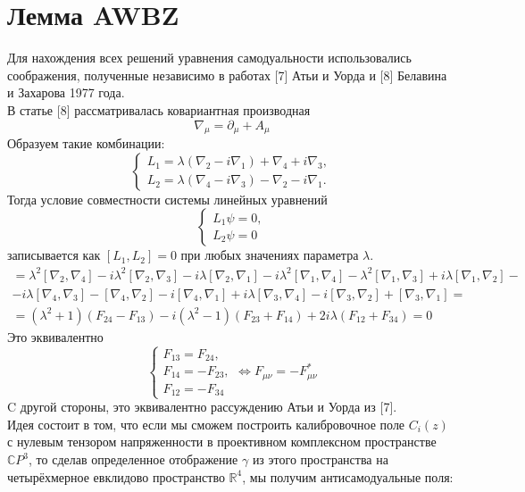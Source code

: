 \documentclass[12pt]{article}
\theoremstyle{definition}
\begin{document}
\section{Лемма AWBZ}
Для нахождения всех решений уравнения самодуальности использовались соображения, полученные независимо в работах [7] Атьи и Уорда и [8] Белавина и Захарова 1977 года.\\
В статье [8] рассматривалась ковариантная производная
\begin{equation}
    \nabla_\mu=\partial_\mu+A_\mu
\end{equation}
Образуем такие комбинации:
\begin{equation}
\begin{cases}
    L_1=\lambda(\nabla_2-i\nabla_1)+\nabla_4+i\nabla_3,\\
    L_2=\lambda(\nabla_4-i\nabla_3)-\nabla_2-i\nabla_1.
\end{cases}
\end{equation}
Тогда условие совместности системы линейных уравнений
\begin{equation}
    \begin{cases}
        L_1\psi=0,\\
        L_2\psi=0
    \end{cases}
\end{equation}
записывается как $[L_1,L_2]=0$ при любых значениях параметра $\lambda$.
\begin{multline}
    [L_1,L_2]=\lambda^2[\nabla_2,\nabla_4]-i\lambda^2[\nabla_2,\nabla_3]-i\lambda[\nabla_2,\nabla_1]-i\lambda^2[\nabla_1,\nabla_4]-\lambda^2[\nabla_1,\nabla_3]+i\lambda[\nabla_1,\nabla_2]-\\-i\lambda[\nabla_4,\nabla_3]-[\nabla_4,\nabla_2]-i[\nabla_4,\nabla_1]+i\lambda[\nabla_3,\nabla_4]-i[\nabla_3,\nabla_2]+[\nabla_3,\nabla_1]=\\=(\lambda^2+1)(F_{24}-F_{13})-i(\lambda^2-1)(F_{23}+F_{14})+2i\lambda(F_{12}+F_{34})=0
\end{multline}
Это эквивалентно
\begin{equation}
    \begin{cases}
        F_{13}=F_{24},\\
        F_{14}=-F_{23},\\
        F_{12}=-F_{34}
    \end{cases}\Leftrightarrow F_{\mu\nu}=-F^*_{\mu\nu}
\end{equation}
C другой стороны, это эквивалентно рассуждению Атьи и Уорда из [7].\\
Идея состоит в том, что если мы сможем построить калибровочное поле $C_i(z)$ с нулевым тензором напряженности в проективном комплексном пространстве $\mathbb{C}P^3$, то сделав определенное отображение $\gamma$ из этого пространства на четырёхмерное евклидово пространство $\mathbb{R}^4$, мы получим антисамодуальные поля:
\end{document}
